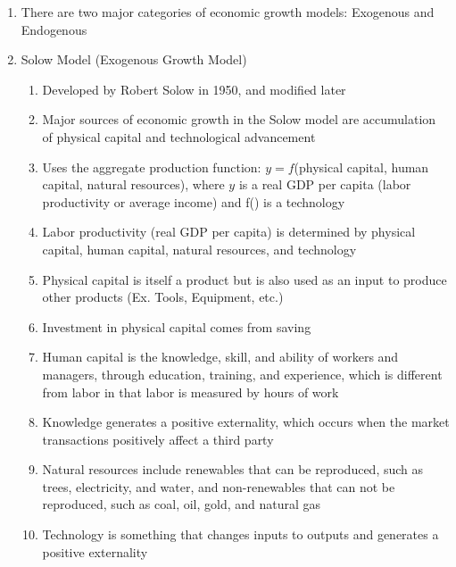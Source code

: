 \documentclass[12pt]{article}
\begin{document}
\begin{enumerate}
\begin{enumerate}
          \item There are two major categories of economic growth models: Exogenous and Endogenous

          \item Solow Model (Exogenous Growth Model)

            \begin{enumerate}

              \item Developed by Robert Solow in 1950, and modified later

              \item Major sources of economic growth in the Solow model are accumulation of physical capital and technological advancement

              \item Uses the aggregate production function: $y = f$(physical capital, human capital, natural resources), where $y$ is a real GDP per capita (labor productivity or average income) and f() is a technology

              \item Labor productivity (real GDP per capita) is determined by physical capital, human capital, natural resources, and technology

              \item Physical capital is itself a product but is also used as an input to produce other products (Ex. Tools, Equipment, etc.)

              \item Investment in physical capital comes from saving

              \item Human capital is the knowledge, skill, and ability of workers and managers, through education, training, and experience, which is different from labor in that labor is measured by hours of work

              \item Knowledge generates a positive externality, which occurs when the market transactions positively affect a third party

              \item Natural resources include renewables that can be reproduced, such as trees, electricity, and water, and non-renewables that can not be reproduced, such as coal, oil, gold, and natural gas

              \item Technology is something that changes inputs to outputs and generates a positive externality


\end{enumerate}
\end{enumerate}
\end{enumerate}
\end{document}
